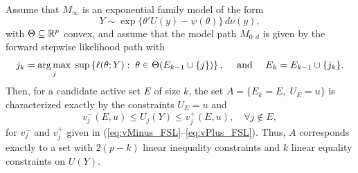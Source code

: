 \documentclass{article}
\begin{document}
\begin{theorem}
  Assume that $M_\infty$ is an exponential family model
  of the form
  \[
  Y \sim \exp\{ \theta'U(y) - \psi(\theta) \}\,d\nu(y),
  \]
  with $\Theta \subseteq \mathbb{R}^p$ convex, and assume that the model path $M_{0:d}$ is given by the forward stepwise likelihood path with
\begin{equation}
j_k = \operatorname*{arg\,max}_j \;\sup \left\{\ell(\theta; Y):\; \theta\in\Theta(E_{k-1} \cup \{j\})\right\}, \quad \text{ and } \quad
E_k = E_{k-1} \cup \{j_k\}.
\end{equation}
  Then, for a candidate active set $E$ of size $k$, the set $A = \{E_k = E, \;U_E = u\}$ is characterized exactly by the constraints $U_E = u$ and
  \[
  v_j^-(E,u) \leq U_j(Y) \leq v_j^+(E,u), \quad\forall j \notin E,
  \]
  for $v_j^-$ and $v_j^+$ given in (\ref{eq:vMinus_FSL}--\ref{eq:vPlus_FSL}). Thus, $A$ corresponds exactly to a set with $2(p-k)$ linear inequality constraints and $k$ linear equality constraints on $U(Y)$.
\end{theorem}
\end{document}
